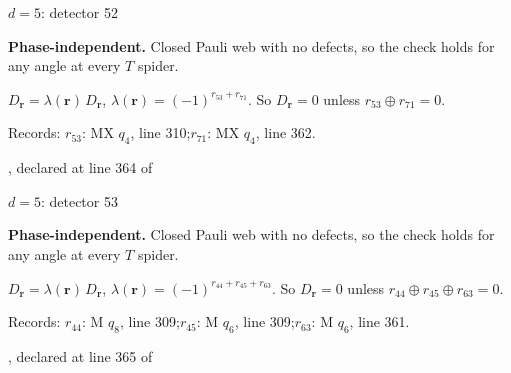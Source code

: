 \label{d5_det052}
{\Large $d=5$: detector 52}\par
\textbf{Phase-independent.} Closed Pauli web with no defects, so the check holds for any angle at every $T$ spider.
\begin{center}
\end{center}
\vspace{-1mm}
$D_{\boldsymbol r}=\lambda(\boldsymbol r)\,D_{\boldsymbol r}$, \quad $\lambda(\boldsymbol r)=(-1)^{r_{53}+r_{71}}$. \qquad So $D_{\boldsymbol r}=0$ unless $r_{53}\oplus r_{71}=0$.
\par\smallskip\begin{minipage}{.98\linewidth}\small Records: $r_{53}$: MX $q_{4}$, line 310;\quad $r_{71}$: MX $q_{4}$, line 362.\end{minipage}
\vfill
{\footnotesize\texttt{}, declared at line 364 of \texttt{}}
\newpage

\label{d5_det053}
{\Large $d=5$: detector 53}\par
\textbf{Phase-independent.} Closed Pauli web with no defects, so the check holds for any angle at every $T$ spider.
\begin{center}
\end{center}
\vspace{-1mm}
$D_{\boldsymbol r}=\lambda(\boldsymbol r)\,D_{\boldsymbol r}$, \quad $\lambda(\boldsymbol r)=(-1)^{r_{44}+r_{45}+r_{63}}$. \qquad So $D_{\boldsymbol r}=0$ unless $r_{44}\oplus r_{45}\oplus r_{63}=0$.
\par\smallskip\begin{minipage}{.98\linewidth}\small Records: $r_{44}$: M $q_{8}$, line 309;\quad $r_{45}$: M $q_{6}$, line 309;\quad $r_{63}$: M $q_{6}$, line 361.\end{minipage}
\vfill
{\footnotesize\texttt{}, declared at line 365 of \texttt{}}
\newpage

